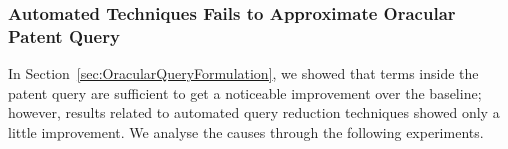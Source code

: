 \subsubsection{Automated Techniques Fails to Approximate Oracular Patent Query}
%
%
In Section~\ref{sec:OracularQueryFormulation}, we showed that terms inside the patent query are sufficient to get a noticeable improvement over the baseline; 
however, results related to automated query reduction techniques showed only a little improvement. 
We analyse the causes through the following experiments.    

